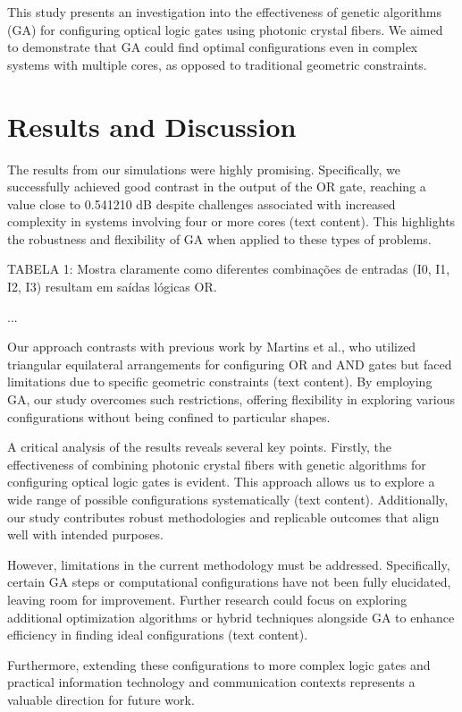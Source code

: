 \documentclass{article}
\begin{document}
This study presents an investigation into the effectiveness of genetic algorithms (GA) for configuring optical logic gates using photonic crystal fibers. We aimed to demonstrate that GA could find optimal configurations even in complex systems with multiple cores, as opposed to traditional geometric constraints.

\section*{Results and Discussion}
The results from our simulations were highly promising. Specifically, we successfully achieved good contrast in the output of the OR gate, reaching a value close to 0.541210 dB despite challenges associated with increased complexity in systems involving four or more cores (text content). This highlights the robustness and flexibility of GA when applied to these types of problems.

\begin{table}[H!]
    \centering
    \caption{TABELA 1: Mostra claramente como diferentes combinações de entradas (I0, I1, I2, I3) resultam em saídas lógicas OR.}
    ...
\end{table}

Our approach contrasts with previous work by Martins et al., who utilized triangular equilateral arrangements for configuring OR and AND gates but faced limitations due to specific geometric constraints (text content). By employing GA, our study overcomes such restrictions, offering flexibility in exploring various configurations without being confined to particular shapes.

A critical analysis of the results reveals several key points. Firstly, the effectiveness of combining photonic crystal fibers with genetic algorithms for configuring optical logic gates is evident. This approach allows us to explore a wide range of possible configurations systematically (text content). Additionally, our study contributes robust methodologies and replicable outcomes that align well with intended purposes.

However, limitations in the current methodology must be addressed. Specifically, certain GA steps or computational configurations have not been fully elucidated, leaving room for improvement. Further research could focus on exploring additional optimization algorithms or hybrid techniques alongside GA to enhance efficiency in finding ideal configurations (text content).

Furthermore, extending these configurations to more complex logic gates and practical information technology and communication contexts represents a valuable direction for future work.
\end{document}
